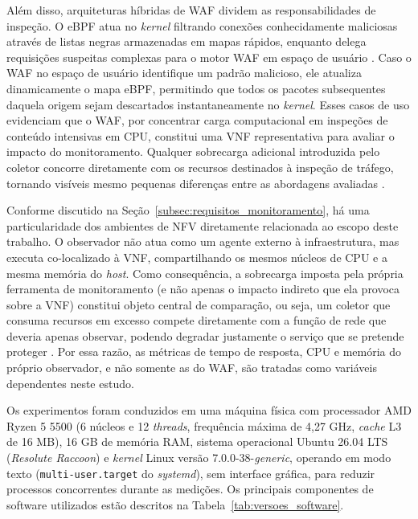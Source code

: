Além disso, arquiteturas híbridas de WAF dividem as responsabilidades de inspeção. O eBPF atua no \textit{kernel} filtrando conexões conhecidamente maliciosas através de listas negras armazenadas em mapas rápidos, enquanto delega requisições suspeitas complexas para o motor WAF em espaço de usuário \cite{hybridvnf2017}. Caso o WAF no espaço de usuário identifique um padrão malicioso, ele atualiza dinamicamente o mapa eBPF, permitindo que todos os pacotes subsequentes daquela origem sejam descartados instantaneamente no \textit{kernel}. Esses casos de uso evidenciam que o WAF, por concentrar carga computacional em inspeções de conteúdo intensivas em CPU, constitui uma VNF representativa para avaliar o impacto do monitoramento. Qualquer sobrecarga adicional introduzida pelo coletor concorre diretamente com os recursos destinados à inspeção de tráfego, tornando visíveis mesmo pequenas diferenças entre as abordagens avaliadas \cite{10.1145/3397022}.

Conforme discutido na Seção~\ref{subsec:requisitos_monitoramento}, há uma particularidade dos ambientes de NFV diretamente relacionada ao escopo deste trabalho. O observador não atua como um agente externo à infraestrutura, mas executa co-localizado à VNF, compartilhando os mesmos núcleos de CPU e a mesma memória do \textit{host}. Como consequência, a sobrecarga imposta pela própria ferramenta de monitoramento (e não apenas o impacto indireto que ela provoca sobre a VNF) constitui objeto central de comparação, ou seja, um coletor que consuma recursos em excesso compete diretamente com a função de rede que deveria apenas observar, podendo degradar justamente o serviço que se pretende proteger \cite{10.1145/3397022}. Por essa razão, as métricas de tempo de resposta, CPU e memória do próprio observador, e não somente as do WAF, são tratadas como variáveis dependentes neste estudo.

Os experimentos foram conduzidos em uma máquina física com processador AMD Ryzen 5 5500 (6 núcleos e 12 \textit{threads}, frequência máxima de 4,27 GHz, \textit{cache} L3 de 16 MB), 16 GB de memória RAM, sistema operacional Ubuntu 26.04 LTS (\textit{Resolute Raccoon}) e \textit{kernel} Linux versão 7.0.0-38-\textit{generic}, operando em modo texto (\texttt{multi-user.target} do \textit{systemd}), sem interface gráfica, para reduzir processos concorrentes durante as medições. Os principais componentes de software utilizados estão descritos na Tabela~\ref{tab:versoes_software}.

